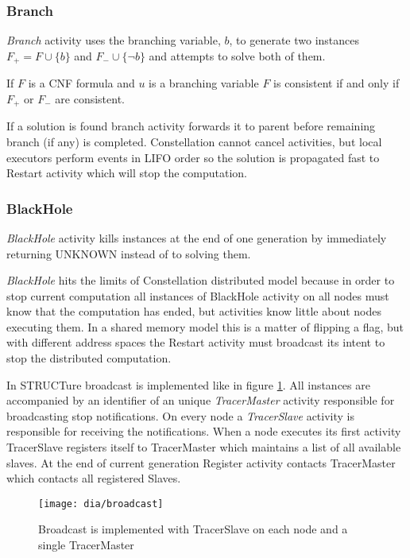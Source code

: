 \subsubsection{Branch}

\emph{Branch} activity uses the branching variable, $b$, to generate
two instances $F_+ = F \cup \{b\}$ and $F_- \cup \{\neg b\}$ and attempts
to solve both of them.

\begin{myprop}
  If $F$ is a CNF formula and $u$ is a branching variable
  $F$ is consistent if and only if $F_+$ or $F_-$ are consistent.
\end{myprop}

If a solution is found branch activity forwards it to parent before
remaining branch (if any) is completed. Constellation cannot cancel
activities, but local executors perform events in LIFO order so
the solution is propagated fast to Restart activity which will stop
the computation.


\subsubsection{BlackHole}
\label{sssec:blackhole}

\emph{BlackHole} activity kills instances at the end of one
generation by immediately returning \textsf{UNKNOWN} instead of to
solving them.

\emph{BlackHole} hits the limits of Constellation distributed
model because in order to stop current computation all instances of
BlackHole activity on all nodes must know that the computation has
ended, but activities know little about nodes executing them. In
a shared memory model this is a matter of flipping a flag, but with
different address spaces the Restart activity must broadcast its
intent to stop the distributed computation.

In STRUCTure broadcast is implemented like in figure
\ref{fig:broadcast}.  All instances are accompanied by an
identifier of an unique \emph{TracerMaster} activity responsible for
broadcasting stop notifications. On every node a \emph{TracerSlave}
activity is responsible for receiving the notifications. When a
node executes its first activity TracerSlave registers itself to
TracerMaster which maintains a list of all available slaves. At the
end of current generation Register activity contacts TracerMaster
which contacts all registered Slaves.

\begin{figure}[h]
  \centering
  \texttt{[image: dia/broadcast]}
  \caption{Broadcast is implemented with
  TracerSlave on each node and a single TracerMaster}
  \label{fig:broadcast}
\end{figure}


